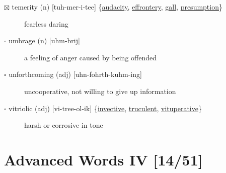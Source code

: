\documentclass[11pt]{article}
\begin{document}
\begin{description}
\item[{$\boxtimes$ \label{orgd7c2d20} \label{org0f0706a}temerity (n) [tuh-mer-i-tee] \{\hyperref[org67e3069]{audacity}, \hyperref[orgfd36353]{effrontery}, \hyperref[orge1299c1]{gall}, \hyperref[org8e41497]{presumption}\}}] fearless daring
\item[{$\square$ umbrage (n) [uhm-brij]}] a feeling of anger caused by being offended
\item[{$\square$ unforthcoming (adj) [uhn-fohrth-kuhm-ing]}] uncooperative, not willing to give up information
\item[{$\square$ \label{orga346b37}vitriolic (adj) [vi-tree-ol-ik] \{\hyperref[org56976d1]{invective}, \hyperref[orgb5ddc36]{truculent}, \hyperref[org5485467]{vituperative}\}}] harsh or corrosive in tone
\end{description}
\section{Advanced Words IV [14/51]}
\label{sec:org0d2388d}
\end{document}
